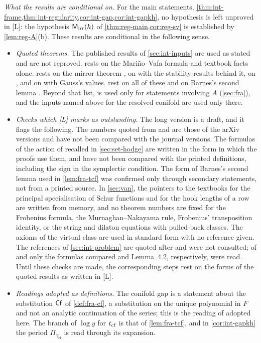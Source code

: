 \emph{What the results are conditional on.} For the main statements, \cref{thm:int-frame,thm:int-regularity,cor:int-gap,cor:int-gapkh}, no hypothesis is left unproved in \textup{[L]}: the hypothesis $\mathsf{M}_{\mathrm{irr}}(h)$ of \cref{thm:reg-main,cor:reg-sv} is established by \cref{lem:reg-A}\textup{(b)}. These results are conditional in the following sense.
\begin{itemize}
\item \emph{Quoted theorems.} The published results of \cref{sec:int-inputs} are used as stated and are not reproved.  rests on the Mari\~no--Vafa formula \cite{LLZ03} and textbook facts alone.  rests on the mirror theorem \cite[Theorem~31]{CCIT15}, on \cite{Tel12} with the stability results behind it, on \cite{PPZ15,GP99,CG07,FP00,Mum83,Pan98}, and on \cite[Eq.~15.6.7]{DLMF} with Gauss's values.  rest on all of these and on Barnes's second lemma \cite{Bar10}. Beyond that list, \cite[Lemma~4.2]{BFGW21} is used only for statements involving $A$ (\cref{sec:fra}), and the inputs named above for the resolved conifold are used only there.
\item \emph{Checks which \textup{[L]} marks as outstanding.} The long version is a draft, and it flags the following. The numbers quoted from \cite{CCIT15} and \cite{Tel12} are those of the arXiv versions and have not been compared with the journal versions. The formulas of the action of \cite{PPZ15} recalled in \cref{sec:set-hodge} are written in the form in which the proofs use them, and have not been compared with the printed definitions, including the sign in the symplectic condition. The form of Barnes's second lemma used in \cref{lem:fra-tcf} was confirmed only through secondary statements, not from a printed source. In \cref{sec:van}, the pointers to the textbooks for the principal specialisation of Schur functions and for the hook lengths of a row are written from memory, and no theorem numbers are fixed for the Frobenius formula, the Murnaghan--Nakayama rule, Frobenius' transposition identity, or the string and dilaton equations with pulled-back classes. The axioms of the virtual class are used in standard form with no reference given. The references \cite{HK10,CI18,ZZ08} of \cref{sec:int-problem} are quoted after \cite{BS} and were not consulted; of \cite{LP18} and \cite{BFGW21} only the formulas compared and Lemma~4.2, respectively, were read. Until these checks are made, the corresponding steps rest on the forms of the quoted results as written in \textup{[L]}.
\item \emph{Readings adopted as definitions.} The conifold gap is a statement about the substitution $\mathsf{Cf}$ of \cref{def:fra-cf}, a substitution on the unique polynomial in $F$ and not an analytic continuation of the series; this is the reading of \cite{BS} adopted here. The branch of $\log y$ for $t_{\mathrm{cf}}$ is that of \cref{lem:fra-tcf}, and in \cref{cor:int-gapkh} the period $\Pi_{\gamma_{\mathrm{cf}}}$ is read through its expansion.

\end{itemize}
